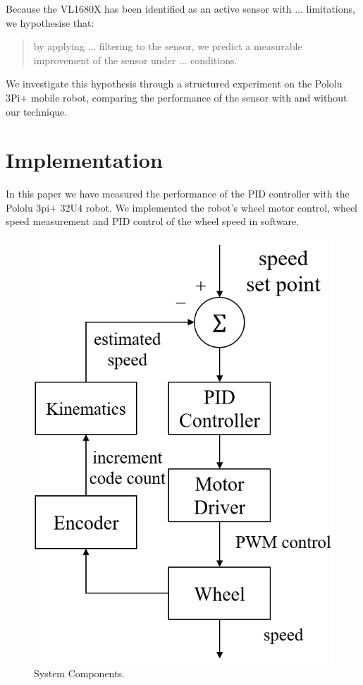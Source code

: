 \documentclass[conference]{IEEEtran}
\begin{document}
Because the VL1680X has been identified as an active sensor with ... limitations, we hypothesise that:
\begin{quote}
    by applying ... filtering to the sensor, we predict a measurable improvement of the sensor under ... conditions.  
\end{quote}

We investigate this hypothesis through a structured experiment on the Pololu 3Pi+ mobile robot, comparing the performance of the sensor with and without our technique.  

\section{Implementation}
In this paper we have measured the performance of the PID controller with the Pololu 3pi+ 32U4 robot. We implemented the robot's wheel motor control, wheel speed measurement and PID control of the wheel speed in software.

\begin{figure}[htbp]
\centerline{\includegraphics[width=0.6\linewidth]{Report/Pic/ImplementFLowChart.png}}
\caption{System Components.}
\label{fig1}
\end{figure}
\end{document}
